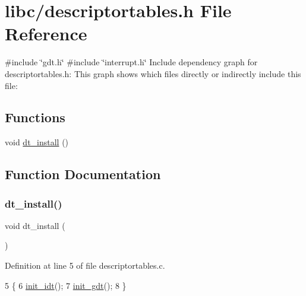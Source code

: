 \hypertarget{a00047}{}\section{libc/descriptortables.h File Reference}
\label{a00047}
{\ttfamily \#include \char`\"{}gdt.\+h\char`\"{}}\newline
{\ttfamily \#include \char`\"{}interrupt.\+h\char`\"{}}\newline
Include dependency graph for descriptortables.\+h\+:
This graph shows which files directly or indirectly include this file\+:
\subsection*{Functions}
\begin{DoxyCompactItemize}
\item 
void \hyperlink{a00047_a4c38e3f3ee100ca4323081bf0970c1ac_a4c38e3f3ee100ca4323081bf0970c1ac}{dt\+\_\+install} ()
\end{DoxyCompactItemize}


\subsection{Function Documentation}
\mbox{\label{a00047_a4c38e3f3ee100ca4323081bf0970c1ac_a4c38e3f3ee100ca4323081bf0970c1ac}} 
\subsubsection{\texorpdfstring{dt\+\_\+install()}{dt\_install()}}
{\footnotesize\ttfamily void dt\+\_\+install (\begin{DoxyParamCaption}{ }\end{DoxyParamCaption})}



Definition at line 5 of file descriptortables.\+c.


\begin{DoxyCode}
5                   \{
6     \hyperlink{a00074_a35fe413107af682030ab7a4b6dff19b8_a35fe413107af682030ab7a4b6dff19b8}{init\_idt}();
7     \hyperlink{a00068_a86bb50044169930202cc403376ef40c3_a86bb50044169930202cc403376ef40c3}{init\_gdt}();
8 \}
\end{DoxyCode}
